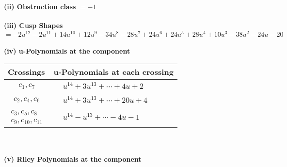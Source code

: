 \documentclass[1p]{elsarticle_modified}
\theoremstyle{definition}
\begin{document}
\flushleft \textbf{(ii) Obstruction class $= -1$}\\~\\
\flushleft \textbf{(iii) Cusp Shapes $= -2 u^{12}-2 u^{11}+14 u^{10}+12 u^9-34 u^8-28 u^7+24 u^6+24 u^5+28 u^4+10 u^3-38 u^2-24 u-20$}\\~\\
\newpage\renewcommand{\arraystretch}{1}
\flushleft \textbf{(iv) u-Polynomials at the component}\newline \\
\begin{tabular}{m{50pt}|m{274pt}}
Crossings & \hspace{64pt}u-Polynomials at each crossing \\
\hline $$\begin{aligned}c_{1},c_{7}\end{aligned}$$&$\begin{aligned}
&u^{14}+3 u^{13}+\cdots+4 u+2
\end{aligned}$\\
\hline $$\begin{aligned}c_{2},c_{4},c_{6}\end{aligned}$$&$\begin{aligned}
&u^{14}+3 u^{13}+\cdots+20 u+4
\end{aligned}$\\
\hline $$\begin{aligned}c_{3},c_{5},c_{8}\\c_{9},c_{10},c_{11}\end{aligned}$$&$\begin{aligned}
&u^{14}- u^{13}+\cdots-4 u-1
\end{aligned}$\\
\hline
\end{tabular}\\~\\
\newpage\renewcommand{\arraystretch}{1}
\flushleft \textbf{(v) Riley Polynomials at the component}\newline \\
\end{document}
